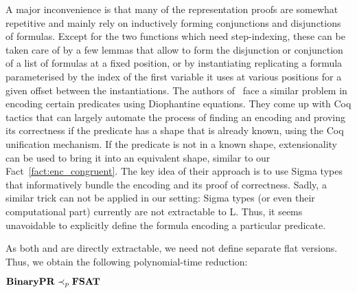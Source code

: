 A major inconvenience is that many of the representation proofs are somewhat repetitive and mainly rely on inductively forming conjunctions and disjunctions of formulas. Except for the two functions which need step-indexing, these can be taken care of by a few lemmas that allow to form the disjunction or conjunction of a list of formulas at a fixed position, or by instantiating replicating a formula parameterised by the index of the first variable it uses at various positions for a given offset between the instantiations. 
The authors of~\cite{Larchey-WendlingForster:2019:H10_in_Coq} face a similar problem in encoding certain predicates using Diophantine equations. They come up with Coq tactics that can largely automate the process of finding an encoding and proving its correctness if the predicate has a shape that is already known, using the Coq unification mechanism. If the predicate is not in a known shape, extensionality can be used to bring it into an equivalent shape, similar to our Fact~\ref{fact:enc_congruent}.
The key idea of their approach is to use Sigma types that informatively bundle the encoding and its proof of correctness. 
Sadly, a similar trick can not be applied in our setting: Sigma types (or even their computational part) currently are not extractable to L. Thus, it seems unavoidable to explicitly define the formula encoding a particular predicate.

As both \BPR{} and \fsat{} are directly extractable, we need not define separate flat versions. Thus, we obtain the following polynomial-time reduction:
\begin{theorem}
  $\textbf{BinaryPR}{} \prec_p{} \textbf{FSAT}{}$
\end{theorem}
